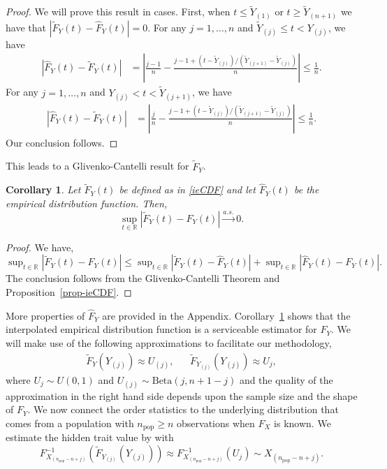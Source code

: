 \documentclass[11pt]{article}
\newcommand{\R}{\mathbb{R}}
\newcommand{\npop}{n_{\text{pop}}}
\newcommand{\nsys}{n}
\newtheorem{cor}{Corollary}
\begin{document}
\begin{proof}
We will prove this result in cases. First, when $t \leq \widetilde Y_{(1)}$ or $t \geq \widetilde Y_{(\nsys + 1)}$ we have that $|\widetilde F_Y(t) - \widehat F_Y(t)| = 0$. 
For any $j = 1,\ldots,\nsys$ and $\widetilde Y_{(j)} \leq t < Y_{(j)}$, we have
\begin{align*}
  |\widehat F_Y(t) - \widetilde F_Y(t)| 
    &= \left\lvert\frac{j-1}{\nsys} 
      - \frac{j - 1 + (t-\widetilde Y_{(j)})/(\widetilde Y_{(j+1)}-\widetilde Y_{(j)})}
        {\nsys}\right\rvert \leq \frac{1}{\nsys}.  
\end{align*}
For any $j = 1,\ldots,\nsys$ and $Y_{(j)} < t < \widetilde Y_{(j+1)}$, we have
\begin{align*}
  |\widehat F_Y(t) - \widetilde F_Y(t)| 
    &= \left\lvert\frac{j}{\nsys} 
      - \frac{j - 1 + (t-\widetilde Y_{(j)})/(\widetilde Y_{(j+1)}-\widetilde Y_{(j)})}
        {\nsys}\right\rvert \leq \frac{1}{\nsys}. 
\end{align*}
Our conclusion follows.
\end{proof}


This leads to a Glivenko-Cantelli result for $\widetilde F_Y$.

\begin{cor} \label{cor-ieCDF}
Let $\widetilde F_Y(t)$ be defined as in \eqref{ieCDF} and let $\widehat F_Y(t)$ be the empirical distribution function. Then,
$$
  \sup_{t \in \R}|\widetilde F_Y(t) - F_Y(t)| \overset{a.s.}{\longrightarrow} 0.
$$
\end{cor}

\begin{proof}
We have,
$
  \sup_{t \in \R}|\widetilde F_Y(t) - F_Y(t)| 
    \leq \sup_{t \in \R}|\widetilde F_Y(t) -  \widehat F_Y(t)|
      + \sup_{t \in \R}|\widehat F_Y(t) - F_Y(t)|. 
$
The conclusion follows from the Glivenko-Cantelli Theorem and Proposition~\ref{prop-ieCDF}.
\end{proof}

More properties of $\widehat F_Y$ are provided in the Appendix. Corollary~\ref{cor-ieCDF} shows that the interpolated empirical distribution function is a serviceable estimator for $F_Y$. We will make use of the following approximations to facilitate our methodology,
\begin{align*}
  \widetilde F_Y(Y_{(j)}) \approx U_{(j)}, &&  \widetilde F_{Y_{(j)}}(Y_{(j)}) \approx U_j, 
\end{align*}
where $U_j \sim U(0,1)$ and $U_{(j)} \sim \text{Beta}(j, \nsys + 1 - j)$ and the quality of the approximation in the right hand side depends upon the sample size and the shape of $F_Y$. We now connect the order statistics to the underlying distribution that comes from a population with $\npop \geq \nsys$ observations when $F_X$ is known. We estimate the hidden trait value by with 
$$
  F^{-1}_{X_{(\npop - \nsys + j)}}\left(\widetilde F_{Y_{(j)}}(Y_{(j)})\right) 
    \approx F^{-1}_{X_{(\npop - \nsys + j)}}\left(U_j\right) 
    \sim X_{(\npop - \nsys + j)}.
$$
\end{document}

